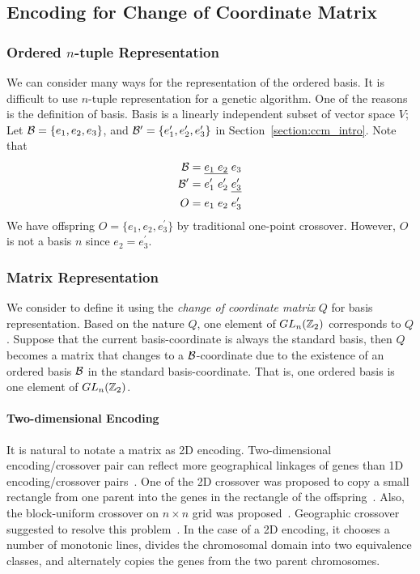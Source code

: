 
\subsection{Encoding for Change of Coordinate Matrix} \label{section:encoding}

\subsubsection{Ordered $ n $-tuple Representation}
We can consider many ways for the representation of the ordered basis.
It is difficult to use $ n $-tuple representation for a genetic algorithm.
One of the reasons is the definition of basis. Basis is a linearly independent subset of vector space $ V $;\\
Let $ \mathcal{B} = \{ e_1, e_2, e_3 \} $, and $ \mathcal{B}^\prime = \{ e_1^\prime, e_2^\prime, e_3^\prime \} $ in Section~\ref{section:ccm_intro}.
Note that
\begin{align*}
    \mathcal{B}        &= \underline{e_1   \;     e_2}   \;     e_3\\
    \mathcal{B}^\prime &= e_1^\prime \; e_2^\prime       \;  \underline{e_3^\prime} \\
    O &= e_1 \; e_2 \; e_3^\prime 
\end{align*}
We have offspring $ O = \{ e_1, e_2, e_3^\prime \} $ by traditional one-point crossover.
However, $ O $ is not a basis $n$ since $ e_2 = e_3^\prime $.

\subsubsection{Matrix Representation}
We consider to define it using the \textit{change of coordinate matrix} $ Q $ for basis representation.
Based on the nature $ Q $, one element of $ GL_n(\mathbb{Z}_2) $ corresponds to $ Q $.
Suppose that the current basis-coordinate is always the standard basis, then $ Q $ becomes a matrix that changes to a $\mathcal{B}$-coordinate due to the existence of an ordered basis $\mathcal{B}$ in the standard basis-coordinate. That is, one ordered basis is one element of $ GL_n(\mathbb{Z}_2) $.

\paragraph{Two-dimensional Encoding}
It is natural to notate a matrix as 2D encoding.
Two-dimensional encoding/crossover pair can reflect more geographical linkages of genes than 1D encoding/crossover pairs~\cite{moon1998georg}.
One of the 2D crossover was proposed to copy a small rectangle from one parent into the genes in the rectangle of the offspring~\cite{cohoon1987genetic}.
Also, the block-uniform crossover on $ n \times n $ grid was proposed~\cite{anderson1991two}.
Geographic crossover suggested to resolve this problem~\cite{kahng1995toward,moon1998georg,park2002genetic}. In the case of a 2D encoding, it chooses a number of monotonic lines, divides the chromosomal domain into two equivalence classes, and alternately copies the genes from the two parent chromosomes.

